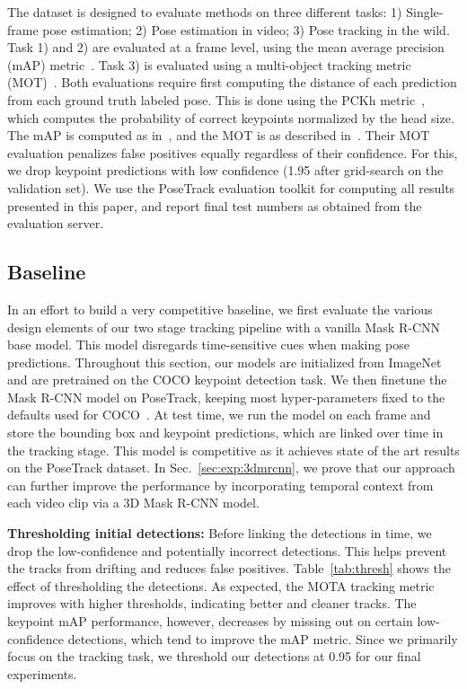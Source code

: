 \documentclass[10pt,twocolumn,letterpaper]{article}
\newcommand{\MODEL}[0]{3D Mask R-CNN}
\begin{document}
The dataset is designed to evaluate methods on three different tasks:
1) Single-frame pose estimation; 2) Pose estimation in video; 
3) Pose tracking in the wild. 
Task 1) and 2) are evaluated at a frame level,
using the mean average precision (mAP) metric~\cite{pishchulin2016deepcut}.
Task 3) is evaluated using a multi-object tracking
metric (MOT)~\cite{bernardin2008evaluating}.
Both evaluations require first computing the distance of each
prediction from each ground truth labeled pose. This is done using the
PCKh metric~\cite{andriluka20142d}, which computes the probability
of correct keypoints normalized by the head size.
The mAP is computed as in~\cite{pishchulin2016deepcut},
and the MOT is as described in~\cite{milan2016mot16}.
Their MOT evaluation penalizes false positives equally regardless of their confidence. For this, we drop keypoint predictions with low confidence (1.95 after grid-search on the validation set).
We use the PoseTrack  evaluation toolkit for computing all results presented in this paper,
and report final test numbers as obtained from the evaluation server.

\subsection{Baseline}

In an effort to build a very competitive baseline, we first evaluate the various design elements of our two stage tracking pipeline with a vanilla Mask R-CNN 
base model. This model disregards time-sensitive cues when making pose predictions. 
Throughout this section, our models are initialized from ImageNet and are pretrained on the COCO keypoint detection task.
We then finetune the Mask R-CNN model on PoseTrack, keeping most hyper-parameters fixed to the defaults used
for COCO~\cite{lin2014microsoft}. 
At test time, we run the model on each frame and store the bounding box and keypoint predictions, which are linked
over time in the tracking stage.
This model is competitive as it achieves state of the art results on the PoseTrack dataset. In Sec.~\ref{sec:exp:3dmrcnn}, we prove that our approach can further improve the performance by incorporating temporal context from each video clip via a \MODEL{} model. 



{\noindent \bf Thresholding initial detections:}
Before linking the detections in time, we drop the low-confidence and potentially incorrect detections.
This helps prevent the tracks from drifting and reduces false positives. Table~\ref{tab:thresh} shows the effect of thresholding the detections. As expected, the MOTA tracking metric~\cite{bernardin2008evaluating} improves with higher thresholds, indicating better and cleaner tracks.
The keypoint mAP performance, however, decreases by missing out on certain low-confidence detections, which tend to improve the mAP metric. Since we primarily focus on the tracking task, we threshold our detections at 0.95 for our final experiments. 
\end{document}
